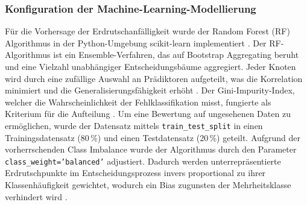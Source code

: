 \documentclass[../main.tex]{subfiles}
\begin{document}
\subsubsection{Konfiguration der Machine-Learning-Modellierung}
Für die Vorhersage der Erdrutschanfälligkeit wurde der Random Forest (RF) Algorithmus in der Python-Umgebung scikit-learn implementiert \autocite{pedregosaScikitlearnMachineLearning2011}.
Der RF-Algorithmus ist ein Ensemble-Verfahren, das auf Bootstrap Aggregating beruht und eine Vielzahl unabhängiger Entscheidungsbäume aggregiert.
Jeder Knoten wird durch eine zufällige Auswahl an Prädiktoren aufgeteilt, was die Korrelation minimiert und die Generalisierungsfähigkeit erhöht \autocite{breimanRandomForests2001}.
Der Gini-Impurity-Index, welcher die Wahrscheinlichkeit der Fehlklassifikation misst, fungierte als Kriterium für die Aufteilung \autocites{douAssessmentAdvancedRandom2019, pedregosaScikitlearnMachineLearning2011}.
Um eine Bewertung auf ungesehenen Daten zu ermöglichen, wurde der Datensatz mittels \texttt{train\_test\_split} in einen Trainingsdatensatz (80\,\%) und einen Testdatensatz (20\,\%) geteilt. Aufgrund der vorherrschenden Class Imbalance wurde der Algorithmus durch den Parameter \texttt{class\_weight='balanced'} adjustiert. Dadurch werden unterrepräsentierte Erdrutschpunkte im Entscheidungsprozess invers proportional zu ihrer Klassenhäufigkeit gewichtet, wodurch ein Bias zugunsten der Mehrheitsklasse verhindert wird \autocite{pedregosaScikitlearnMachineLearning2011}.
\end{document}
